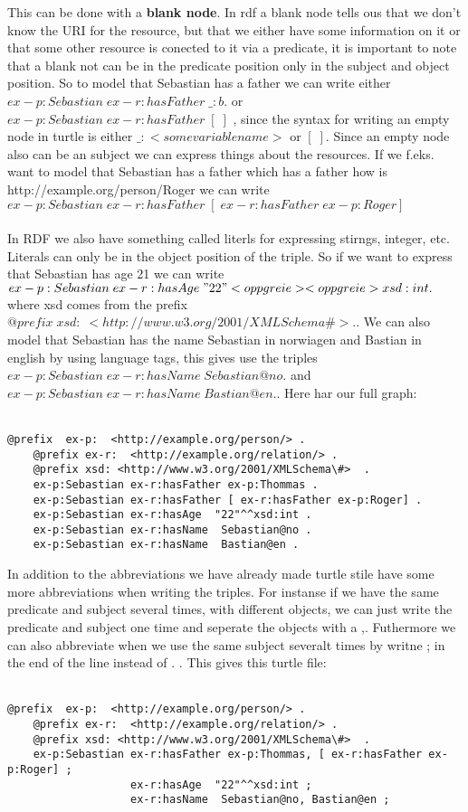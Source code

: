 This can be done with a \textbf{blank node}. In rdf a blank node tells ous that we don't know the URI for the resource, but that we either have some information 
on it or that some other resource is conected to it via a predicate, it is important to note that a blank not can be in the predicate position only in the subject and object
position. So to model that Sebastian has a father we can write either $ex-p:Sebastian\; ex-r:hasFather\; \_:b .$ or $ex-p:Sebastian\; ex-r:hasFather\; [\; ]$ , since the syntax 
for writing an empty node in turtle is either $\_:<some variable name>$ or $[\; ]$. Since an empty node also can be an subject we can express things about the resources. If we 
f.eks. want to model that Sebastian has a father which has a father how is http://example.org/person/Roger we can write $ex-p:Sebastian\; ex-r:hasFather\; [\; ex-r:hasFather\; ex-p:Roger]$
\\ \\ 
In RDF we also have something called literls for expressing stirngs, integer, etc. Literals can only be in the object position of the triple. 
So if we want to express that Sebastian has age 21 we can write $ex-p:Sebastian\; ex-r:hasAge\; " 22 " <opp greie> <opp greie> xsd:int.$ where xsd comes from the prefix
$@prefix\; xsd:\; <http://www.w3.org/2001/XMLSchema\#> .$. We can also model that Sebastian has the name Sebastian in norwiagen and Bastian in english by using 
language tags, this gives use the triples $ex-p:Sebastian\; ex-r:hasName\; Sebastian@no.$ and $ex-p:Sebastian\; ex-r:hasName\; Bastian@en.$. Here har our full 
graph:
\\ \\

\begin{lstlisting}[frame=single, language=turtle]
    @prefix  ex-p:  <http://example.org/person/> . 
    @prefix ex-r:  <http://example.org/relation/> . 
    @prefix xsd: <http://www.w3.org/2001/XMLSchema\#>  . 
    ex-p:Sebastian ex-r:hasFather ex-p:Thommas .
    ex-p:Sebastian ex-r:hasFather [ ex-r:hasFather ex-p:Roger] . 
    ex-p:Sebastian ex-r:hasAge  "22"^^xsd:int . 
    ex-p:Sebastian ex-r:hasName  Sebastian@no . 
    ex-p:Sebastian ex-r:hasName  Bastian@en .
\end{lstlisting}
In addition to the abbreviations we have already made turtle stile have some more abbreviations when writing the triples. For instanse if we have the same 
predicate and subject several times, with different objects, we can just write the predicate and subject one time and seperate the objects with a ,. Futhermore 
we can also abbreviate when we use the same subject severalt times by writne ; in the end of the line instead of . . This gives this turtle file:
\\ \\
\begin{lstlisting}[frame=single, language=turtle]
    @prefix  ex-p:  <http://example.org/person/> . 
    @prefix ex-r:  <http://example.org/relation/> . 
    @prefix xsd: <http://www.w3.org/2001/XMLSchema\#>  . 
    ex-p:Sebastian ex-r:hasFather ex-p:Thommas, [ ex-r:hasFather ex-p:Roger] ; 
                   ex-r:hasAge  "22"^^xsd:int ; 
                   ex-r:hasName  Sebastian@no, Bastian@en ;
\end{lstlisting}

